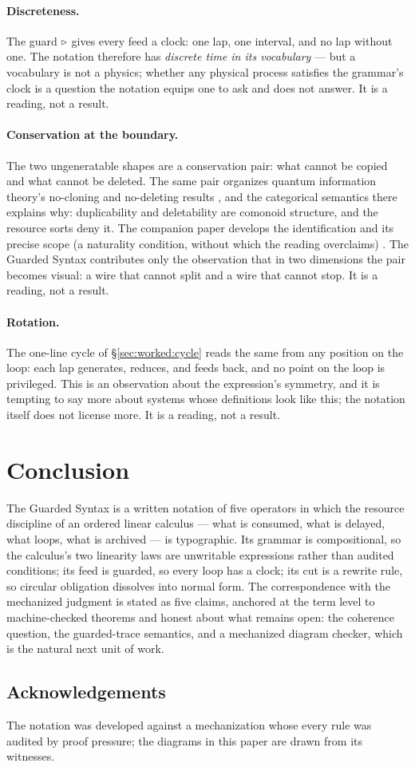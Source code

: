 \documentclass{eptcs}
\begin{document}
\paragraph{Discreteness.} The guard $\triangleright$ gives every feed a
clock: one lap, one interval, and no lap without one. The notation
therefore has \emph{discrete time in its vocabulary} --- but a vocabulary
is not a physics; whether any physical process satisfies the grammar's
clock is a question the notation equips one to ask and does not answer.
It is a reading, not a result.

\paragraph{Conservation at the boundary.} The two ungeneratable shapes
are a conservation pair: what cannot be copied and what cannot be
deleted. The same pair organizes quantum information theory's
no-cloning and no-deleting results
\cite{wootters1982,pati2000}, and the categorical semantics there
\cite{abramsky2004} explains why: duplicability and deletability are
comonoid structure, and the resource sorts deny it. The companion paper
develops the identification and its precise scope (a naturality
condition, without which the reading overclaims)
\cite{dcarecompanion}. The Guarded Syntax contributes only the
observation that in two dimensions the pair becomes visual: a wire that
cannot split and a wire that cannot stop. It is a reading, not a result.

\paragraph{Rotation.} The one-line cycle of \S\ref{sec:worked:cycle}
reads the same from any position on the loop: each lap generates,
reduces, and feeds back, and no point on the loop is privileged. This
is an observation about the expression's symmetry, and it is tempting
to say more about systems whose definitions look like this; the
notation itself does not license more. It is a reading, not a result.

\section{Conclusion}\label{sec:conclusion}

The Guarded Syntax is a written notation of five operators in which the
resource discipline of an ordered linear calculus --- what is consumed,
what is delayed, what loops, what is archived --- is typographic. Its
grammar is compositional, so the calculus's two linearity laws are
unwritable expressions rather than audited conditions; its feed is
guarded, so every loop has a clock; its cut is a rewrite rule, so
circular obligation dissolves into normal form. The
correspondence with the mechanized judgment is stated as five claims,
anchored at the term level to machine-checked theorems and honest about
what remains open: the coherence question, the guarded-trace semantics,
and a mechanized diagram checker, which is the natural next unit of
work.

\subsection*{Acknowledgements} The notation was developed against a
mechanization whose every rule was audited by proof pressure; the
diagrams in this paper are drawn from its witnesses.



\end{document}

